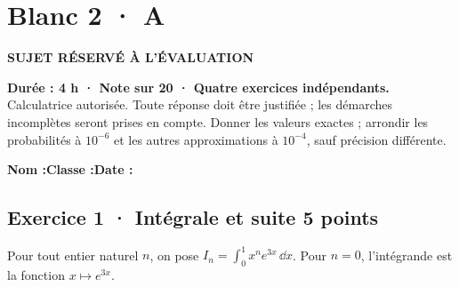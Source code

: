 \fi

\ifprof

\clearpage{}\label{sujet:8-3}

\section*{Blanc 2 · A}

{\sffamily\bfseries\color{amber}SUJET RÉSERVÉ À L'ÉVALUATION\par}

\textbf{Durée : 4 h · Note sur 20 · Quatre exercices indépendants.}\\Calculatrice autorisée. Toute réponse doit être justifiée ; les démarches incomplètes seront prises en compte. Donner les valeurs exactes ; arrondir les probabilités à $10^{-6}$ et les autres approximations à $10^{-4}$, sauf précision différente.

\smallskip\textbf{Nom :}\enspace\dotfill\quad\textbf{Classe :}\enspace\dotfill\quad\textbf{Date :}\enspace\dotfill

\subsection*{Exercice 1 · Intégrale et suite \hfill 5 points}Pour tout entier naturel $n$, on pose $I_n=\displaystyle\int_0^1x^ne^{3x}\,\dd x$. Pour $n=0$, l'intégrande est la fonction $x\mapsto e^{3x}$.

